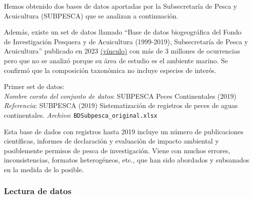 \documentclass[sn-apa,pdflatex]{sn-jnl}
\newenvironment{Shaded}{\begin{snugshade}}{\end{snugshade}}
\newcommand{\AttributeTok}[1]{\textcolor[rgb]{0.13,0.29,0.53}{#1}}
\newcommand{\FunctionTok}[1]{\textcolor[rgb]{0.13,0.29,0.53}{\textbf{#1}}}
\newcommand{\NormalTok}[1]{#1}
\newcommand{\OtherTok}[1]{\textcolor[rgb]{0.56,0.35,0.01}{#1}}
\newcommand{\SpecialCharTok}[1]{\textcolor[rgb]{0.81,0.36,0.00}{\textbf{#1}}}
\newcommand{\StringTok}[1]{\textcolor[rgb]{0.31,0.60,0.02}{#1}}
\begin{document}
Hemos obtenido dos bases de datos aportadas por la Subsecretaría de
Pesca y Acuicultura (SUBPESCA) que se analizan a continuación.

Además, existe un set de datos llamado ``Base de datos biogeográfica del
Fondo de Investigación Pesquera y de Acuicultura (1999-2019),
Subsecretaría de Pesca y Acuicultura'' publicado en 2023
\href{https://www.gbif.org/dataset/9f094ddc-68f9-426b-91f2-4c6f34298b34}{(vínculo)}
con más de 3 millones de ocurrencias pero que no se analizó porque su
área de estudio es el ambiente marino. Se confirmó que la composición
taxonómica no incluye especies de interés.

Primer set de datos:\\
\emph{Nombre corsto del conjunto de datos}: SUBPESCA Peces Continentales
(2019)\\
\emph{Referencia}: SUBPESCA (2019) Sistematización de registros de peces
de aguas continentales. \emph{Archivo}:
\texttt{BDSubpesca\_original.xlsx}

Esta base de dados con registros hasta 2019 incluye un número de
publicaciones científicas, informes de declaración y evaluación de
impacto ambiental y posiblemente permisos de pesca de investigación.
Viene con muchos errores, inconsistencias, formatos heterogéneos, etc.,
que han sido abordados y subsanados en la medida de lo posible.

\subsubsection{Lectura de datos}\label{lectura-de-datos-4}

\begin{Shaded}
\end{Shaded}
\end{document}

